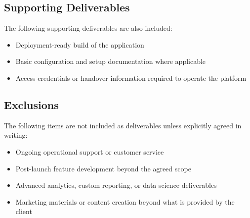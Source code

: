 \subsection{Supporting Deliverables}

The following supporting deliverables are also included:

\begin{itemize}[leftmargin=1.5em]
    \item Deployment-ready build of the application
    \item Basic configuration and setup documentation where applicable
    \item Access credentials or handover information required to operate the
    platform
\end{itemize}

\subsection{Exclusions}

The following items are not included as deliverables unless explicitly agreed in
writing:
\begin{itemize}[leftmargin=1.5em]
    \item Ongoing operational support or customer service
    \item Post-launch feature development beyond the agreed scope
    \item Advanced analytics, custom reporting, or data science deliverables
    \item Marketing materials or content creation beyond what is provided
    by the client
\end{itemize}
